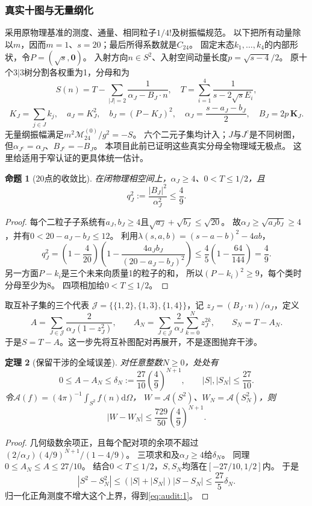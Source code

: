 \documentclass[11pt,a4paper]{ctexart}
\theoremstyle{cnplain}\newtheorem{theorem}{定理}[section]
\newtheorem{proposition}[theorem]{命题}
\theoremstyle{definition}\newtheorem{definition}[theorem]{定义}
\theoremstyle{remark}\newtheorem{remark}[theorem]{注}
\newcommand{\cA}{\mathcal A}
\newcommand{\dd}{\mathrm d}
\begin{document}
\subsubsection{真实十图与无量纲化}
采用原物理基准的测度、通量、相同粒子$1/4!$及树振幅规范。
以下把所有动量除以$m$，因而$m=1$、$s=20$；最后所得系数就是$C_{24}$。
固定末态$k_1,\ldots,k_4$的内部形状，令$P=(\sqrt s,\mathbf0)$。
入射方向$n\in S^2$、入射空间动量长度$p=\sqrt{s-4}/2$。
原十个$3|3$树分割各权重为1，分母和为
\[
 S(n)=T-\sum_{|J|=2}\frac1{\alpha_J-B_J\cdot n},
 \quad
 T=\sum_{i=1}^4\frac1{s-2\sqrt s E_i},
\]
\[
 K_J=\sum_{j\in J}k_j,\quad a_J=K_J^2,\quad
 b_J=(P-K_J)^2,\quad
 \alpha_J=\frac{s-a_J-b_J}{2},\quad B_J=2p\,\mathbf K_J.
\]
无量纲振幅满足$m^2\mathcal M_{24}^{(0)}/g^2=-S$。
六个二元子集均计入；$J$与$J^c$是不同树图，
但$\alpha_{J^c}=\alpha_J$、$B_{J^c}=-B_J$。
本项目此前已证明这些真实分母全物理域无极点。
这里给适用于窄认证的更具体统一估计。

\begin{proposition}[20点的收敛比]\label{audit:prop:ratio}
在闭物理相空间上，$\alpha_J\ge4$、$0<T\le1/2$，且
\[
 q_J^2:=\frac{|B_J|^2}{\alpha_J^2}\le\frac49.
\]
\end{proposition}
\begin{proof}
每个二粒子子系统有$a_J,b_J\ge4$且$\sqrt{a_J}+\sqrt{b_J}\le\sqrt{20}$。
故$\alpha_J\ge\sqrt{a_Jb_J}\ge4$，并有$0<20-a_J-b_J\le12$。
利用$\lambda(s,a,b)=(s-a-b)^2-4ab$，
\[
 q_J^2=\left(1-\frac4{20}\right)
 \left(1-\frac{4a_Jb_J}{(20-a_J-b_J)^2}\right)
 \le\frac45\left(1-\frac{64}{144}\right)=\frac49.
\]
另一方面$P-k_i$是三个未来向质量1的粒子的和，
所以$(P-k_i)^2\ge9$，每个类时分母至少为8。
四项相加给$0<T\le1/2$。
\end{proof}

取互补子集的三个代表
$\mathcal J=\{\{1,2\},\{1,3\},\{1,4\}\}$，记
$z_J=(B_J\cdot n)/\alpha_J$，定义
\[
 A=\sum_{J\in\mathcal J}\frac{2}{\alpha_J(1-z_J^2)},\qquad
 A_N=\sum_{J\in\mathcal J}\frac2{\alpha_J}
             \sum_{k=0}^N z_J^{2k},\qquad S_N=T-A_N.
\]
于是$S=T-A$。这一步先将互补图配对再展开，不是逐图抛弃干涉。

\begin{theorem}[保留干涉的全域误差]\label{audit:thm:tail}
对任意整数$N\ge0$，处处有
\[
 0\le A-A_N\le\delta_N:=\frac{27}{10}\left(\frac49\right)^{N+1},
 \qquad |S|,|S_N|\le\frac{27}{10}.
\]
令$\cA(f)=(4\pi)^{-1}\int_{S^2}f(n)\dd\Omega$，
$W=\cA(S^2)$、$W_N=\cA(S_N^2)$，则
\begin{equation}
 |W-W_N|\le\frac{729}{50}\left(\frac49\right)^{N+1}.       \label{eq:audit:1}\end{equation}
\end{theorem}
\begin{proof}
几何级数余项正，且每个配对项的余项不超过
$(2/\alpha_J)(4/9)^{N+1}/(1-4/9)$。
三项求和及$\alpha_J\ge4$给$\delta_N$。
同理$0\le A_N\le A\le27/10$。
结合$0<T\le1/2$，$S,S_N$均落在$[-27/10,1/2]$内。
于是
\[
 |S^2-S_N^2|\le(|S|+|S_N|)|S-S_N|
 \le\frac{27}{5}\delta_N.
\]
归一化正角测度不增大这个上界，得到\eqref{eq:audit:1}。
\end{proof}
\end{document}
